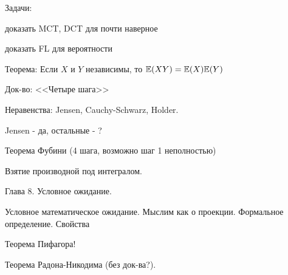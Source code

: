 {Задачи: \par
доказать MCT, DCT для почти наверное \par
доказать FL для вероятности \par


Теорема: Если $X$ и $Y$ независимы, то $\mathbb{E}(XY)=\mathbb{E}(X)\mathbb{E}(Y)$ \par
Док-во: <<Четыре шага>> \par


Неравенства: Jensen, Cauchy-Schwarz, Holder. \par
Jensen - да, остальные - ? \par

Теорема Фубини (4 шага, возможно шаг 1 неполностью) \par
Взятие производной под интегралом. \par





Глава 8. Условное ожидание. \par

Условное математическое ожидание. Мыслим как о проекции.
Формальное определение. Свойства \par
Теорема Пифагора! \par
Теорема Радона-Никодима (без док-ва?). \par


}
